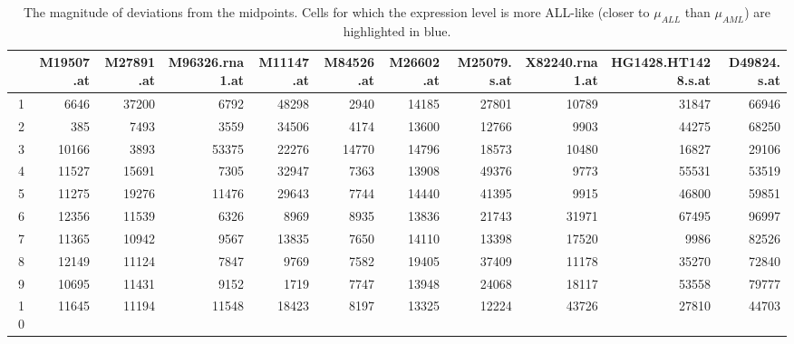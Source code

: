 \begin{table}[ht]
	\tiny
	\centering
	\begin{tabular}{r|rrrrr|rrrrr}
		\hline
		& M19507.at & M27891.at & M96326.rna1.at & M11147.at & M84526.at & M26602.at & M25079.s.at & X82240.rna1.at & HG1428.HT1428.s.at & D49824.s.at \\ 
		\hline
		1 & 6646 \cellcolor{lightblue}& 37200 & 6792 \cellcolor{lightblue}& 48298 & 2940 & 14185 & 27801 & 10789 & 31847 & 66946 \\ 
		2 & 385 \cellcolor{lightblue}& 7493 \cellcolor{lightblue}& 3559 \cellcolor{lightblue}& 34506 & 4174 \cellcolor{lightblue}& 13600 & 12766 & 9903 & 44275 & 68250 \\ 
		3 & 10166 & 3893 \cellcolor{lightblue}& 53375 & 22276 & 14770 & 14796 & 18573 & 10480 & 16827 & 29106 \\ 
		4 & 11527 \cellcolor{lightblue}& 15691 & 7305 \cellcolor{lightblue}& 32947 & 7363 \cellcolor{lightblue}& 13908 & 49376 & 9773 & 55531 & 53519 \\ 
		5 & 11275 \cellcolor{lightblue}& 19276 & 11476 & 29643 & 7744 & 14440 & 41395 & 9915 & 46800 & 59851 \\ 
		6 & 12356 \cellcolor{lightblue}& 11539 \cellcolor{lightblue}& 6326 \cellcolor{lightblue}& 8969 \cellcolor{lightblue}& 8935 \cellcolor{lightblue}& 13836 & 21743 & 31971 \cellcolor{lightblue}& 67495 \cellcolor{lightblue}& 96997 \cellcolor{lightblue}\\ 
		7 & 11365 \cellcolor{lightblue}& 10942 \cellcolor{lightblue}& 9567 \cellcolor{lightblue}& 13835 \cellcolor{lightblue}& 7650 \cellcolor{lightblue}& 14110 & 13398 & 17520 & 9986 & 82526 \cellcolor{lightblue}\\ 
		8 & 12149 \cellcolor{lightblue}& 11124 \cellcolor{lightblue}& 7847 \cellcolor{lightblue}& 9769 \cellcolor{lightblue}& 7582 \cellcolor{lightblue}& 19405 & 37409 & 11178 & 35270 & 72840 \cellcolor{lightblue}\\ 
		9 & 10695 \cellcolor{lightblue}& 11431 \cellcolor{lightblue}& 9152 \cellcolor{lightblue}& 1719 \cellcolor{lightblue}& 7747 \cellcolor{lightblue}& 13948 & 24068 & 18117 & 53558 & 79777 \cellcolor{lightblue}\\ 
		10 & 11645 \cellcolor{lightblue}& 11194 \cellcolor{lightblue}& 11548 \cellcolor{lightblue}& 18423 & 8197 \cellcolor{lightblue}& 13325 & 12224 & 43726 \cellcolor{lightblue}& 27810 & 44703 \\ 
		\hline
	\end{tabular}
		\caption{The magnitude of deviations from the midpoints. Cells for which the expression level is more ALL-like (closer to $\mu_{ALL}$ than $\mu_{AML}$) are highlighted in blue.}
		\label{golubTestDataMagnitudes}
\end{table}

